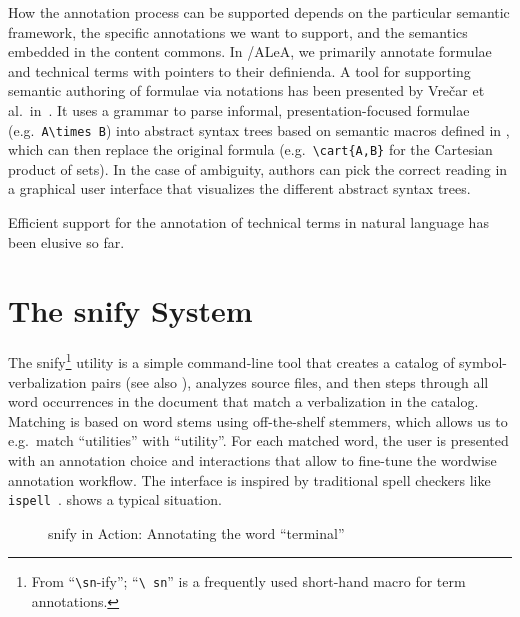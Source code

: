 \documentclass[runningheads]{llncs}
\newcommand\ALeA{\textsf{ALeA}\xspace}
\newcommand\snify{\textsf{snify}\xspace}
\begin{document}
How the annotation process can be supported depends on the particular semantic framework,
the specific annotations we want to support, and the semantics embedded in the content
commons.  In \sTeX/\ALeA, we primarily annotate formulae and technical terms with pointers
to their definienda.  A tool for supporting semantic authoring of formulae via notations
has been presented by Vre{\v{c}}ar et al.\ in~\cite{VreWelKam:tsmmdui24}.  It uses a
grammar to parse informal, presentation-focused formulae (e.g.\
\lstinline[keywordstyle={}]|A\times B|) into abstract syntax trees based on semantic
macros defined in \sTeX, which can then replace the original formula (e.g.\
\lstinline|\cart{A,B}| for the Cartesian product of sets).  In the case of ambiguity,
authors can pick the correct reading in a graphical user interface that visualizes the
different abstract syntax trees.

Efficient support for the annotation of technical terms in natural language
has been elusive so far.


\section{The \snify System}\label{sec:snify}

The \snify\footnote{ From ``\texttt{\textbackslash sn}-ify''; ``\texttt{\textbackslash
    sn}'' is a frequently used \sTeX short-hand macro for term annotations.}  utility
\cite{stextools:git} is a simple command-line tool that creates a catalog of
symbol-verbalization pairs (see also \Cref{sec:workflows}), analyzes \sTeX source files, and then steps through all word
occurrences in the document that match a verbalization in the catalog.  Matching is based
on word stems using off-the-shelf stemmers, which allows us to e.g.\ match ``utilities''
with ``utility''.  For each matched word, the user is presented with an annotation choice
and interactions that allow to fine-tune the wordwise annotation workflow.  The interface
is inspired by traditional spell checkers like \lstinline|ispell|~\cite{ispellman}.   shows
a typical situation.

\begin{figure}[ht]
  \setlength{\fboxsep}{0pt}
  \caption{\snify in Action: Annotating the word ``terminal''}\label{fig:snify}
\end{figure}
\end{document}
